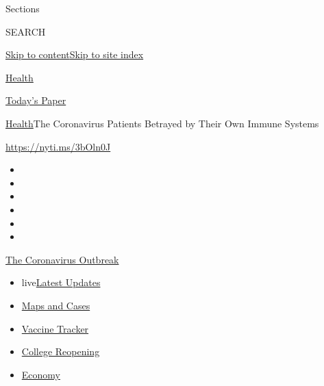 Sections

SEARCH

\protect\hyperlink{site-content}{Skip to
content}\protect\hyperlink{site-index}{Skip to site index}

\href{https://www.nytimes.com/section/health}{Health}

\href{https://myaccount.nytimes.com/auth/login?response_type=cookie\&client_id=vi}{}

\href{https://www.nytimes.com/section/todayspaper}{Today's Paper}

\href{/section/health}{Health}\textbar{}The Coronavirus Patients
Betrayed by Their Own Immune Systems

\url{https://nyti.ms/3bOln0J}

\begin{itemize}
\item
\item
\item
\item
\item
\item
\end{itemize}

\href{https://www.nytimes.com/news-event/coronavirus?action=click\&pgtype=Article\&state=default\&region=TOP_BANNER\&context=storylines_menu}{The
Coronavirus Outbreak}

\begin{itemize}
\tightlist
\item
  live\href{https://www.nytimes.com/2020/08/04/world/coronavirus-cases.html?action=click\&pgtype=Article\&state=default\&region=TOP_BANNER\&context=storylines_menu}{Latest
  Updates}
\item
  \href{https://www.nytimes.com/interactive/2020/us/coronavirus-us-cases.html?action=click\&pgtype=Article\&state=default\&region=TOP_BANNER\&context=storylines_menu}{Maps
  and Cases}
\item
  \href{https://www.nytimes.com/interactive/2020/science/coronavirus-vaccine-tracker.html?action=click\&pgtype=Article\&state=default\&region=TOP_BANNER\&context=storylines_menu}{Vaccine
  Tracker}
\item
  \href{https://www.nytimes.com/2020/08/02/us/covid-college-reopening.html?action=click\&pgtype=Article\&state=default\&region=TOP_BANNER\&context=storylines_menu}{College
  Reopening}
\item
  \href{https://www.nytimes.com/live/2020/08/04/business/stock-market-today-coronavirus?action=click\&pgtype=Article\&state=default\&region=TOP_BANNER\&context=storylines_menu}{Economy}
\end{itemize}


